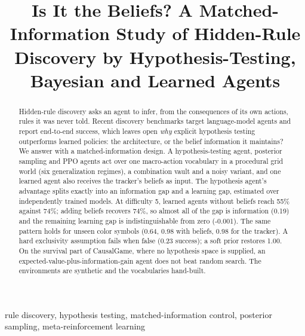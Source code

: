 \documentclass[conference]{IEEEtran}
\begin{document}
\title{Is It the Beliefs? A Matched-Information Study of Hidden-Rule Discovery by Hypothesis-Testing, Bayesian and Learned Agents}
\author{
\and
{}
}
\maketitle

\begin{abstract}
Hidden-rule discovery asks an agent to infer, from the consequences of its own actions, rules it was never told. Recent discovery benchmarks target language-model agents and report end-to-end success, which leaves open \emph{why} explicit hypothesis testing outperforms learned policies: the architecture, or the belief information it maintains? We answer with a matched-information design. A hypothesis-testing agent, posterior sampling and PPO agents act over one macro-action vocabulary in a procedural grid world (six generalization regimes), a combination vault and a noisy variant, and one learned agent also receives the tracker's beliefs as input. The hypothesis agent's advantage splits exactly into an information gap and a learning gap, estimated over independently trained models. At difficulty 5, learned agents without beliefs reach 55\% against 74\%; adding beliefs recovers 74\%, so almost all of the gap is information (0.19) and the remaining learning gap is indistinguishable from zero (-0.001). The same pattern holds for unseen color symbols (0.64, 0.98 with beliefs, 0.98 for the tracker). A hard exclusivity assumption fails when false (0.23 success); a soft prior restores 1.00. On the survival part of CausalGame, where no hypothesis space is supplied, an expected-value-plus-information-gain agent does not beat random search. The environments are synthetic and the vocabularies hand-built.
\end{abstract}
\begin{IEEEkeywords}
rule discovery, hypothesis testing, matched-information control, posterior sampling, meta-reinforcement learning
\end{IEEEkeywords}
\end{document}
